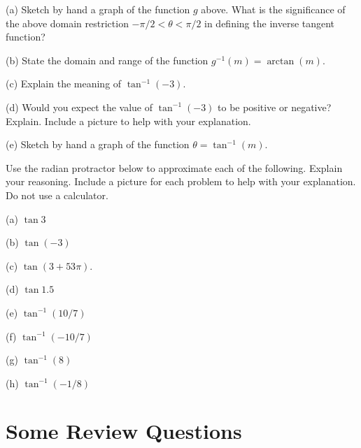\documentclass{ximera}
\begin{document}
\begin{question} \label{Q12:InverseTrig}

(a) Sketch by hand a graph of the function $g$ above. What is the significance of the above domain restriction $-\pi/2 < \theta < \pi/2$  in defining the inverse tangent function?

(b) State the domain and range of the function $g^{-1}(m) = \arctan (m)$.

(c) Explain the meaning of $\tan^{-1}(-3)$.

(d) Would you expect the value of $\tan^{-1}(-3)$ to be positive or negative? Explain. Include a picture to help with your explanation.

(e) Sketch by hand a graph of the function $\theta =  \tan^{-1}(m) $.

\end{question}

\begin{question} \label{Q10:InverseTrig}
Use the radian protractor below to approximate each of the following. Explain your reasoning. Include a picture for each problem to help with your explanation. Do not use a calculator.

(a) $\tan 3$

(b) $\tan (-3)$

(c) $\tan (3+53\pi)$.

(d) $\tan 1.5$

(e) $\tan^{-1}(10/7)$

(f) $\tan^{-1}(-10/7)$

(g) $\tan^{-1}(8)$

(h) $\tan^{-1}(-1/8)$

\begin{exploration}\label{Exp3:Comp}

 
\begin{onlineOnly}
    \begin{center}
\end{center}
\end{onlineOnly}
\end{exploration}

\end{question}


\section{Some Review Questions}
\end{document}
